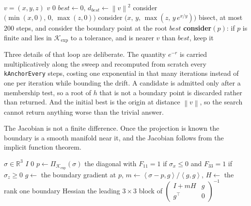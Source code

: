 \documentclass[a4paper,11pt]{book}
\theoremstyle{plain}
\theoremstyle{definition}
\theoremstyle{remark}
\numberwithin{equation}{chapter}
\numberwithin{algorithm}{chapter}
\newcommand{\R}{\mathbb{R}}
\newcommand{\proj}[2]{\Pi_{#2}\!\left(#1\right)}
\newcommand{\norm}[1]{\left\|#1\right\|}
\newcommand{\inner}[2]{\left\langle #1, #2 \right\rangle}
\newcommand{\Kexp}{\mathcal{K}_{\exp}}
\begin{document}
	\begin{algorithm}[H]
		\caption{Projection onto the exponential cone}
		\begin{algorithmic}[1]
			\Require $v=(x,y,z)$
			\If{$v\in\Kexp$} \State \Return $v$
			\ElsIf{$-v\in\Kexp^*$} \State \Return $0$ \EndIf
			\State $best\gets0$, \quad $d_{best}\gets\norm{v}^2$
			\State consider $\bigl(\min(x,0),\,0,\,\max(z,0)\bigr)$
			\State consider $\bigl(x,\,y,\,\max(z,\,y\,e^{x/y})\bigr)$
			\EndIf
			\State bisect, at most $200$ steps, and consider the boundary point at
			the root
			\EndIf
			\EndFor
			\State \Return $best$
			\Statex
			\Statex \textbf{consider}$(p)$: if $p$ is finite and lies in $\Kexp$ to a
			tolerance, and is nearer $v$ than $best$, keep it
		\end{algorithmic}
	\end{algorithm}

	Three details of that loop are deliberate. The quantity $e^{-r}$ is carried
	multiplicatively along the sweep and recomputed from scratch every
	\texttt{kAnchorEvery} steps, costing one exponential in that many iterations
	instead of one per iteration while bounding the drift. A candidate is admitted
	only after a membership test, so a root of $h$ that is not a boundary point is
	discarded rather than returned. And the initial best is the origin at distance
	$\norm{v}$, so the search cannot return anything worse than the trivial
	answer.

	The Jacobian is not a finite difference. Once the projection is known the
	boundary is a smooth manifold near it, and the Jacobian follows from the
	implicit function theorem.

	\begin{algorithm}[H]
		\caption{The Jacobian of the projection onto the exponential cone}
		\begin{algorithmic}[1]
			\Require $\sigma\in\R^3$
			\If{$\sigma\in\Kexp$} \State \Return $I$
			\ElsIf{$-\sigma\in\Kexp^*$} \State \Return $0$ \EndIf
			\State $p\gets\proj{\sigma}{\Kexp}$
			\State \Return the diagonal with $F_{11}=1$ if $\sigma_x\leq0$ and
			$F_{33}=1$ if $\sigma_z\geq0$
			\EndIf
			\State $g\gets$ the boundary gradient at $p$, \quad
			$m\gets\inner{\sigma-p}{g}/\inner{g}{g}$, \quad
			$H\gets$ the rank one boundary Hessian
			\State \Return the leading $3\times3$ block of
			$\begin{pmatrix} I+mH & g\\ g^{\top} & 0\end{pmatrix}^{-1}$
		\end{algorithmic}
	\end{algorithm}
\end{document}
